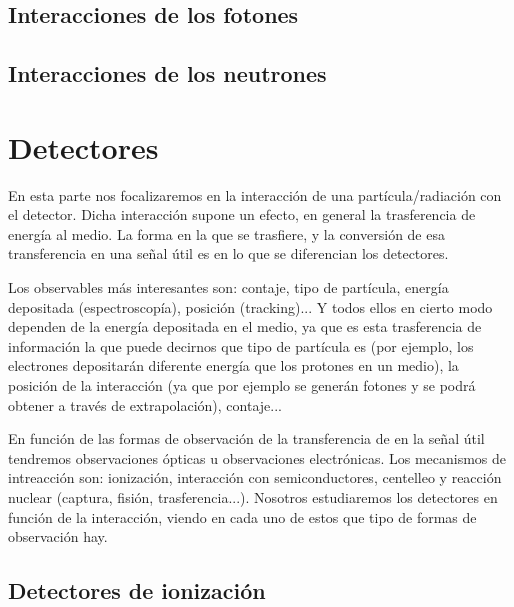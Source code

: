      
\subsection{Interacciones de los fotones}



\subsection{Interacciones de los neutrones}



\section{Detectores}

En esta parte nos focalizaremos en la interacción de una partícula/radiación con el detector. Dicha interacción supone un efecto, en general la trasferencia de energía al medio. La forma en la que se trasfiere, y la conversión de esa transferencia en una señal útil es en lo que se diferencian los detectores. 

Los observables más interesantes son: contaje, tipo de partícula, energía depositada (espectroscopía), posición (tracking)... Y todos ellos en cierto modo dependen de la energía depositada en el medio, ya que es esta trasferencia de información la que puede decirnos que tipo de partícula es (por ejemplo, los electrones depositarán diferente energía que los protones en un medio), la posición de la interacción (ya que por ejemplo se generán fotones y se podrá obtener a través de extrapolación), contaje... 

En función de las formas de observación de la transferencia de en la señal útil tendremos observaciones ópticas u observaciones electrónicas. Los mecanismos de intreacción son: ionización, interacción con semiconductores, centelleo y reacción nuclear (captura, fisión, trasferencia...). Nosotros estudiaremos los detectores en función de la interacción, viendo en cada uno de estos que tipo de formas de observación hay. 

\subsection{Detectores de ionización}

